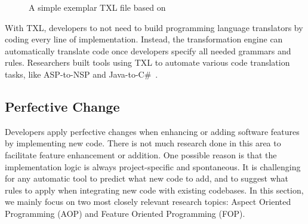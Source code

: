 \documentclass[runningheads,a4paper]{llncs}
\begin{document}
\begin{figure}
\centering
{}
\caption{A simple exemplar TXL file based on~\cite{txltour}}
\label{fig:txl}
\end{figure}
With TXL, developers to not need to build programming language translators by coding every line of implementation. Instead, the transformation engine can automatically translate code once developers specify all needed grammars and rules. Researchers built tools using TXL to automate various code translation tasks, like ASP-to-NSP and Java-to-C\#~\cite{Chu:08,Hassan:2005,El-Ramly:2006,Tonella:04}.

\subsection{Perfective Change}
\label{sec:perfective}
Developers apply perfective changes when enhancing or adding software features by implementing new code. There is not much research done in this area to facilitate feature enhancement or addition. One possible reason is that the implementation logic is always project-specific and spontaneous. It is challenging for any automatic tool to predict what new code to add, and to suggest what rules to apply when integrating new code with existing codebases. In this section, we mainly focus on two most closely relevant research topics: Aspect Oriented Programming (AOP) and Feature Oriented Programming (FOP).
\end{document}
